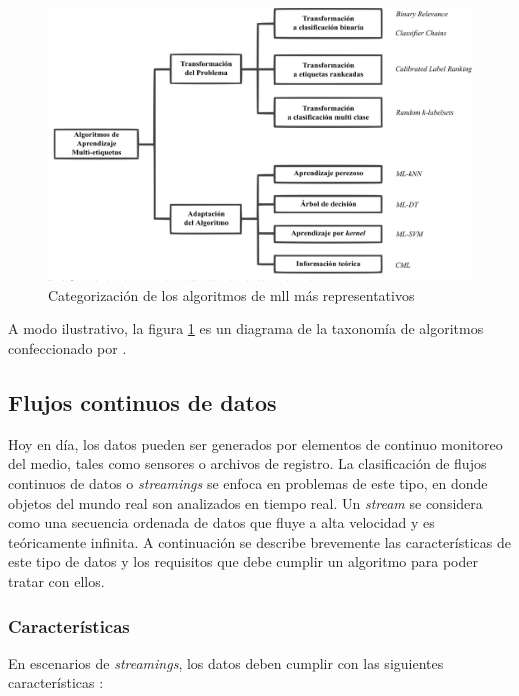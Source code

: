 \begin{figure}
   \includegraphics[width=\linewidth]{figures/algorithm_taxonomy.png}
   \caption{Categorización de los algoritmos de \acrshort{mll} más representativos}
   \label{fig:algorithm_taxonomy} 
\end{figure}

A modo ilustrativo, la figura \ref{fig:algorithm_taxonomy} es un diagrama de la
taxonomía de algoritmos confeccionado por \citeauthor{zhang_review_2014} \cite
{zhang_review_2014}.

\subsection{Flujos continuos de datos}
\label{intro_streams}

Hoy en día, los datos pueden ser generados por elementos de continuo monitoreo
del medio, tales como sensores o archivos de registro.  La clasificación de
flujos continuos de datos o \textit{streamings} se enfoca en problemas de este
tipo, en donde objetos del mundo real son analizados en tiempo real. Un
\textit{stream} se considera como una secuencia ordenada de datos que fluye a
alta velocidad y es teóricamente infinita. A continuación se describe brevemente
las características de este tipo de datos y los requisitos que debe cumplir un
algoritmo para poder tratar con ellos.

\subsubsection{Características}
\label{stream_caracteristicas}

En escenarios de \textit{streamings}, los datos deben cumplir con las siguientes
características \cite {gama_knowledge_2010}: 

